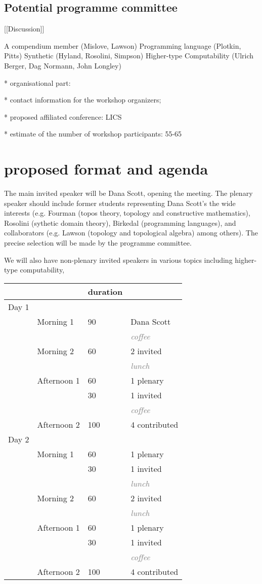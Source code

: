 \documentclass{article}
\newcommand{\grey}{\textcolor{grey}}
\begin{document}
\subsection{Potential programme committee}

[[Discussion]]

A compendium member (Mislove, Lawson)
Programming language (Plotkin, Pitts)
Synthetic (Hyland, Rosolini, Simpson)
Higher-type Computability (Ulrich Berger, Dag Normann, John Longley)

* organisational part:

*        contact information for the workshop organizers;

*        proposed affiliated conference: LICS


* estimate of the number of workshop participants: 55-65

\section{proposed format and agenda}

The main invited speaker will be Dana Scott, opening the meeting.
The plenary speaker should include former students representing Dana Scott's the wide interests (e.g. Fourman (topos theory, topology and constructive mathematics), Rosolini (sythetic domain theory), Birkedal (programming languages), and collaborators (e.g. Lawson (topology and topological algebra) among others). The precise selection will be made by the programme committee.

We will also have non-plenary invited speakers in various topics including higher-type computability, 

\begin{tabular}{|l|l|l|l|}
\hline & & duration & \\ \hline
\hline Day 1 & & & \\ \hline 
& Morning 1 & 90 & Dana Scott \\
& & & \grey{\emph{coffee}}   \\
& Morning 2 & 60 & 2 invited \\
& & & \grey{\emph{lunch}}   \\
& Afternoon 1 & 60 & 1 plenary \\
&  & 30 & 1 invited \\
& & & \grey{\emph{coffee}} \\
& Afternoon 2 & 100 & 4 contributed \\
\hline Day 2 & & & \\ \hline
& Morning 1 & 60 & 1 plenary \\
&           & 30 & 1 invited \\
& & & \grey{\emph{lunch}}  \\
& Morning 2 & 60 & 2 invited \\
& & & \grey{\emph{lunch}}  \\
& Afternoon 1 & 60 & 1 plenary \\
& & 30 & 1 invited \\
& & & \grey{\emph{coffee}}  \\
& Afternoon 2 & 100 & 4 contributed \\ \hline  
\end{tabular}
\end{document}
